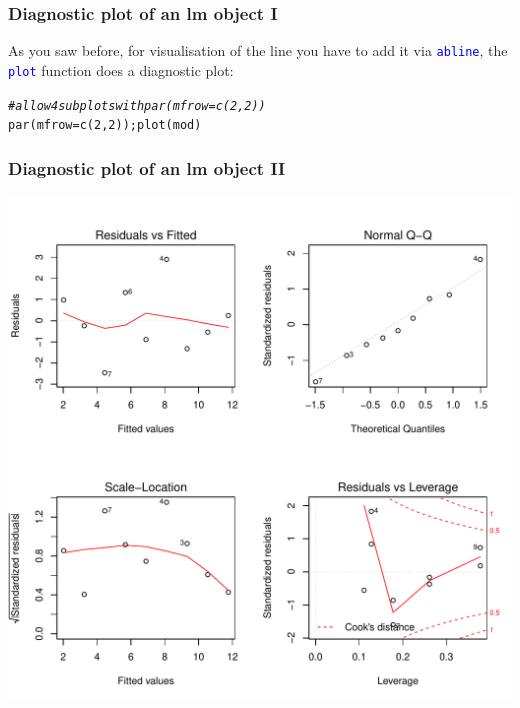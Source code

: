 \documentclass[xcolor=table, xcolor=dvipsnames]{beamer}\usepackage[]{graphicx}\usepackage[]{color}
\makeatletter
\newcommand{\hlnum}[1]{\textcolor[rgb]{0,0,0}{#1}}
\newcommand{\hlcom}[1]{\textcolor[rgb]{0,0.392,0}{\textit{#1}}}
\newcommand{\hlstd}[1]{\textcolor[rgb]{0,0,0}{#1}}
\newcommand{\hlkwc}[1]{\textcolor[rgb]{1,0,1}{#1}}
\newcommand{\hlkwd}[1]{\textcolor[rgb]{0,0,1}{#1}}
\newenvironment{kframe}{%
 \def\at@end@of@kframe{}%
 \ifinner\ifhmode%
  \def\at@end@of@kframe{\end{minipage}}%
  \begin{minipage}{\columnwidth}%
 \fi\fi%
 \def\FrameCommand##1{\hskip\@totalleftmargin \hskip-\fboxsep
 \colorbox{shadecolor}{##1}\hskip-\fboxsep
     \hskip-\linewidth \hskip-\@totalleftmargin \hskip\columnwidth}%
 \MakeFramed {\advance\hsize-\width
   \@totalleftmargin\z@ \linewidth\hsize
   \@setminipage}}%
 {\par\unskip\endMakeFramed%
 \at@end@of@kframe}
\newenvironment{knitrout}{}{} %
\newcommand{\rcode}[1]{\texttt{\textcolor{Blue}{#1}}} %
\makeatother
\begin{document}



\begin{frame}[fragile]\frametitle{Diagnostic plot of an lm object I}
As you saw before, for visualisation of the line you have to add it via \rcode{abline}, the \rcode{plot} function does a diagnostic plot:
\begin{knitrout}
\color{fgcolor}\begin{kframe}
\begin{alltt}
\hlcom{# allow 4 subplots with par(mfrow=c(2,2))}
\hlkwd{par}\hlstd{(}\hlkwc{mfrow}\hlstd{=}\hlkwd{c}\hlstd{(}\hlnum{2}\hlstd{,}\hlnum{2}\hlstd{));} \hlkwd{plot}\hlstd{(mod)}
\end{alltt}
\end{kframe}
\end{knitrout}
\end{frame}





\begin{frame}[fragile]\frametitle{Diagnostic plot of an lm object II}
\begin{center}
\includegraphics[width=.6\textwidth]{./externalfig/lmplot.pdf}
\end{center}
\end{frame}
\end{document}
